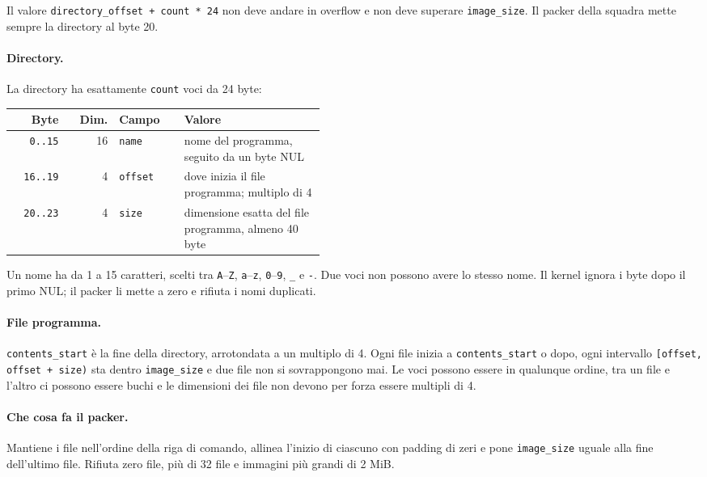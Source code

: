 Il valore \texttt{directory\_offset + count * 24} non deve andare in overflow e non deve superare \texttt{image\_size}. Il packer della squadra mette sempre la directory al byte 20.

\paragraph{Directory.} La directory ha esattamente \texttt{count} voci da 24 byte:

\begin{center}
\small
\begin{tabular}{|r|r|l|p{0.45\linewidth}|}
\hline
Byte & Dim. & Campo & \raggedright Valore \tabularnewline
\hline\hline
\texttt{0..15} & 16 & \texttt{name} & \raggedright nome del programma, seguito da un byte NUL \tabularnewline
\hline
\texttt{16..19} & 4 & \texttt{offset} & \raggedright dove inizia il file programma; multiplo di 4 \tabularnewline
\hline
\texttt{20..23} & 4 & \texttt{size} & \raggedright dimensione esatta del file programma, almeno 40 byte \tabularnewline
\hline
\end{tabular}
\end{center}

Un nome ha da 1 a 15 caratteri, scelti tra \texttt{A}--\texttt{Z}, \texttt{a}--\texttt{z}, \texttt{0}--\texttt{9}, \texttt{\_} e \texttt{-}. Due voci non possono avere lo stesso nome. Il kernel ignora i byte dopo il primo NUL; il packer li mette a zero e rifiuta i nomi duplicati.

\paragraph{File programma.} \texttt{contents\_start} è la fine della directory, arrotondata a un multiplo di 4. Ogni file inizia a \texttt{contents\_start} o dopo, ogni intervallo \texttt{[offset, offset + size)} sta dentro \texttt{image\_size} e due file non si sovrappongono mai. Le voci possono essere in qualunque ordine, tra un file e l'altro ci possono essere buchi e le dimensioni dei file non devono per forza essere multipli di 4.

\paragraph{Che cosa fa il packer.} Mantiene i file nell'ordine della riga di comando, allinea l'inizio di ciascuno con padding di zeri e pone \texttt{image\_size} uguale alla fine dell'ultimo file. Rifiuta zero file, più di 32 file e immagini più grandi di 2 MiB.

